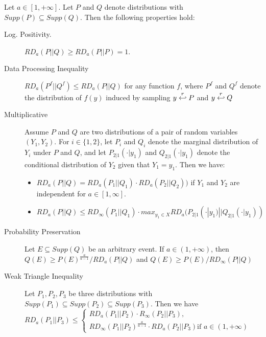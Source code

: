 \begin{lemma}
  Let \(a \in [1, +\infty]\). Let \(P\) and \(Q\) denote distributions with
  \(Supp(P) \subseteq Supp(Q)\). Then the following properties hold:
  \begin{description}
  \item [Log. Positivity.] \(RD_{a}(P || Q) \geq RD_{a}(P||P) = 1\).
  \item[Data Processing Inequality]
    \(RD_{a}(P^{f} || Q^{f}) \leq RD_{a}(P || Q)\) for any function \(f\), where
    \(P^{f}\) and \(Q^{f}\) denote the distribution of \(f(y)\) induced by
    sampling \(y \stackrel{r}{\hookleftarrow} P\) and \(y \stackrel{r}{\hookleftarrow} Q\)
  \item[Multiplicative] Assume \(P\) and \(Q\) are two distributions of a pair
    of random variables \((Y_{1}, Y_{2})\). For \(i \in \{1,2\}\), let \(P_{i}\)
    and \(Q_{i}\) denote the marginal distribution of \(Y_{i}\) under \(P\) and
    \(Q\), and let \(P_{2|1}(\cdot | y_{1})\) and \(Q_{2|1}(\cdot | y_{1})\)
    denote the conditional distribution of \(Y_{2}\) given that
    \(Y_{1} = y_{1}\). Then we have:
    \begin{itemize}
    \item \(RD_{a}(P||Q) = RD_{a}(P_{1}||Q_{1}) \cdot RD_{a}(P_{2}||Q_{2}))\) if
    \(Y_{1}\) and \(Y_{2}\) are independent for \(a \in [1,\infty]\).
    \item
    \(RD_{a}(P||Q) \leq RD_{\infty}(P_{1} || Q_{1}) \cdot max_{y_{1} \in X}
    RD_{a}(P_{2|1}(\cdot | y_{1})||Q_{2|1}(\cdot | y_{1}))\)
    \end{itemize}
  \item[Probability Preservation] Let \(E \subseteq Supp(Q)\) be an arbitrary
    event. If \(a \in (1, +\infty)\), then
    \(Q(E) \geq P(E)^{\frac{a}{a-1}}/RD_{a}(P||Q)\) and
    \(Q(E) \geq P(E)/RD_{\infty}(P||Q)\)
  \item[Weak Triangle Inequality] Let \(P_{1}, P_{2}, P_{3}\) be three
    distributions with
    \(Supp(P_{1}) \subseteq Supp(P_{2}) \subseteq Supp(P_{3})\). Then we have\\
    \(RD_{a}(P_{1}||P_{3}) \leq
    \begin{cases}
      RD_{a}(P_{1}||P_{2}) \cdot R_{\infty}(P_{2}||P_{3}),\\
      RD_{\infty}(P_{1}||P_{2})^{\frac{a}{a-1}} \cdot RD_{a}(P_{2}||P_{3})
      \text{if } a \in (1,+\infty)
    \end{cases}
\)
  \end{description}
\end{lemma}

